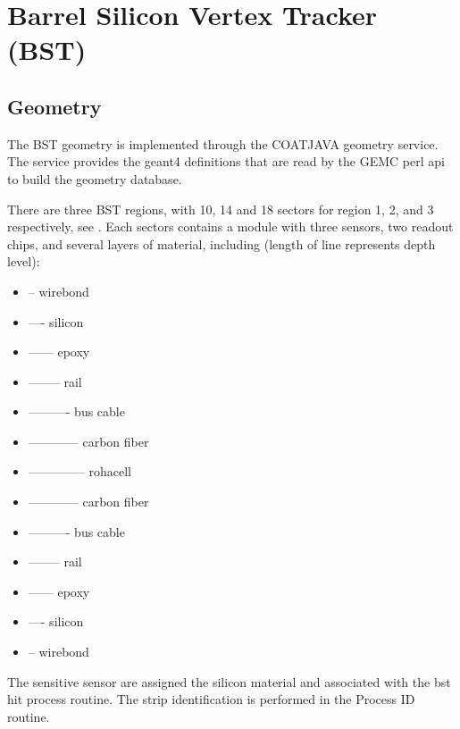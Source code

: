 \section{Barrel Silicon Vertex Tracker (BST)}


\subsection{Geometry}


The BST geometry is implemented through the COATJAVA geometry service.
The service provides the geant4 definitions that are read by the GEMC perl api to build the geometry database.

There are three BST regions, with 10, 14 and 18 sectors for region 1, 2, and 3 respectively, see .
Each sectors contains a module with three sensors, two readout chips, and several layers of material,
including (length of line represents depth level):

\begin{itemize}
	\item -- wirebond
	\item ---- silicon
	\item ------ epoxy
	\item -------- rail
	\item ---------- bus cable
	\item ------------ carbon fiber
	\item -------------- rohacell
	\item ------------ carbon fiber
	\item ---------- bus cable
	\item -------- rail
	\item ------ epoxy
	\item ---- silicon
	\item -- wirebond
\end{itemize}

The sensitive sensor are assigned the silicon material and associated with the bst hit process routine.
The strip identification is performed in the Process ID routine.

